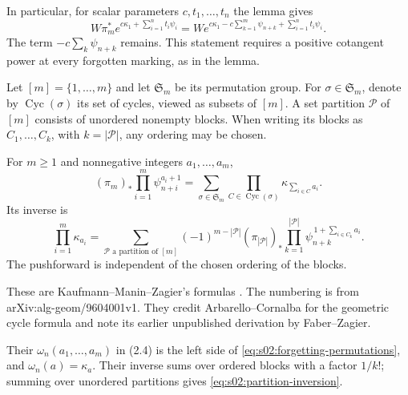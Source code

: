 In particular, for scalar parameters $c,t_1,\ldots,t_n$ the lemma gives
\begin{equation}
\label{eq:s02:tail-exponential}
W\pi_m^*e^{c\kappa_1+\sum_{i=1}^nt_i\psi_i}
=W e^{c\kappa_1-c\sum_{k=1}^m\psi_{n+k}+\sum_{i=1}^nt_i\psi_i}.
\end{equation}
The term $-c\sum_k\psi_{n+k}$ remains.  This statement requires a
positive cotangent power at every forgotten marking, as in the lemma.

Let $[m]=\{1,\ldots,m\}$ and let $\mathfrak S_m$ be its permutation
group.  For $\sigma\in\mathfrak S_m$, denote by
$\operatorname{Cyc}(\sigma)$ its set of cycles, viewed as subsets of
$[m]$.  A set partition $\mathcal P$ of $[m]$ consists of unordered
nonempty blocks.  When writing its blocks as $C_1,\ldots,C_k$, with
$k=|\mathcal P|$, any ordering may be chosen.

\begin{lmm}
\label{lmm:s02:forgetting-inversion}
For $m\geq1$ and nonnegative integers $a_1,\ldots,a_m$,
\begin{equation}
\label{eq:s02:forgetting-permutations}
(\pi_m)_*\prod_{i=1}^m\psi_{n+i}^{a_i+1}
=\sum_{\sigma\in\mathfrak S_m}
\prod_{C\in\operatorname{Cyc}(\sigma)}\kappa_{\sum_{i\in C}a_i}.
\end{equation}
Its inverse is
\begin{equation}
\label{eq:s02:partition-inversion}
\prod_{i=1}^m\kappa_{a_i}
=\sum_{\mathcal P\text{ a partition of }[m]}
(-1)^{m-|\mathcal P|}(\pi_{|\mathcal P|})_*
\prod_{k=1}^{|\mathcal P|}
\psi_{n+k}^{\,1+\sum_{i\in C_k}a_i}.
\end{equation}
The pushforward is independent of the chosen ordering of the blocks.
\end{lmm}

These are Kaufmann--Manin--Zagier's formulas
\cite[Theorem 2.2, (2.6), and Lemma 2.2.1, (2.8)]{KMZ96}.
The numbering is from arXiv:alg-geom/\allowbreak 9604001v1.
They credit Arbarello--Cornalba for the geometric cycle formula and
note its earlier unpublished derivation by Faber--Zagier.

Their
$\omega_n(a_1,\ldots,a_m)$ in (2.4) is the left side of
\eqref{eq:s02:forgetting-permutations}, and $\omega_n(a)=\kappa_a$.
Their inverse sums over ordered blocks with a factor $1/k!$; summing
over unordered partitions gives \eqref{eq:s02:partition-inversion}.

